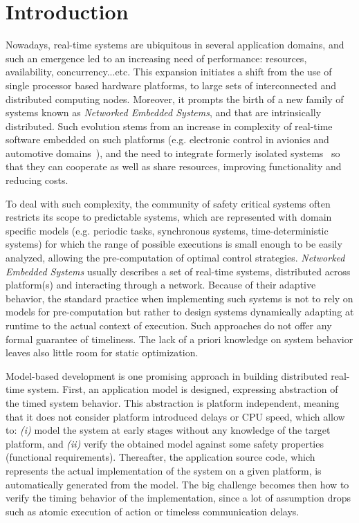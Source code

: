 \section{Introduction}

Nowadays, real-time systems are ubiquitous in several application domains, 
and such an emergence led to an increasing need of performance: resources, 
availability, concurrency...etc. This expansion initiates a shift from the
use of single processor based hardware platforms, to large sets 
of interconnected and distributed computing nodes. Moreover, it prompts the birth 
of a new family of systems known as \emph{Networked Embedded Systems}, and
that are intrinsically distributed.
Such evolution stems from an increase in complexity of real-time software 
embedded on such platforms (e.g. electronic control in avionics 
and automotive domains~\cite{Charette09}), and the need to integrate 
formerly isolated systems~\cite{Kopetz:2004:IAD:1032662.1034360} so that 
they can cooperate as well as share resources, improving functionality 
and reducing costs.

To deal with such complexity, the community of safety critical systems 
often restricts its scope to predictable systems, which are represented 
with domain specific models (e.g. periodic tasks, synchronous systems, 
time-deterministic systems) for which the range of possible executions 
is small enough to be easily analyzed, allowing the pre-computation 
of optimal control strategies.
\emph{Networked Embedded Systems} usually describes a set of real-time systems, 
distributed across platform(s) and interacting through a network. 
Because of their adaptive behavior, the standard practice when implementing 
such systems is not to rely on models for pre-computation but rather to design
systems dynamically adapting at runtime to the actual context of execution.
Such approaches do not offer any formal guarantee of timeliness.
The lack of a priori knowledge on system behavior leaves also little room for 
static optimization.

Model-based development is one promising approach in building distributed 
real-time system. First, an application model is designed, expressing 
abstraction of the timed system behavior. This abstraction is platform 
independent, meaning that it does not consider platform introduced delays 
or CPU speed, which allow to: \emph{(i)} model the system at early stages 
without any knowledge of the target platform, and \emph{(ii)} verify 
the obtained model against some safety properties (functional requirements).
Thereafter, the application source code, which represents the actual 
implementation of the system on a given platform, 
is automatically generated from the model. The big challenge becomes then 
how to verify the timing behavior of the implementation, since a lot of 
assumption drops such as atomic execution of action or timeless communication delays. 

